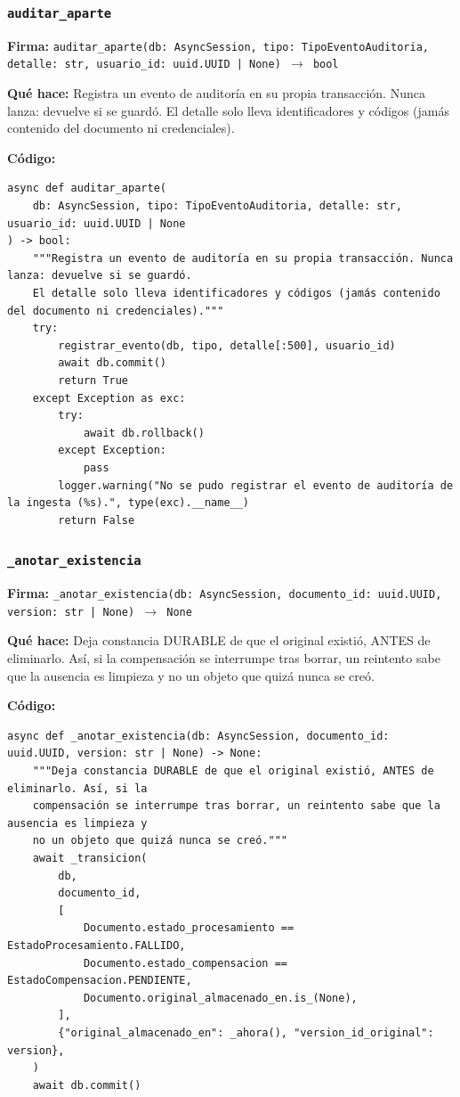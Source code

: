 \documentclass[11pt,a4paper]{article}
\begin{document}
\subsubsection*{\texttt{auditar\_aparte}}
\textbf{Firma:} \texttt{auditar\_aparte(db: AsyncSession, tipo: TipoEventoAuditoria, detalle: str, usuario\_id: uuid.UUID | None) $\rightarrow$ bool}

\textbf{Qué hace:} Registra un evento de auditoría en su propia transacción. Nunca lanza: devuelve si se guardó.
El detalle solo lleva identificadores y códigos (jamás contenido del documento ni credenciales).

\textbf{Código:}
\begin{lstlisting}
async def auditar_aparte(
    db: AsyncSession, tipo: TipoEventoAuditoria, detalle: str, usuario_id: uuid.UUID | None
) -> bool:
    """Registra un evento de auditoría en su propia transacción. Nunca lanza: devuelve si se guardó.
    El detalle solo lleva identificadores y códigos (jamás contenido del documento ni credenciales)."""
    try:
        registrar_evento(db, tipo, detalle[:500], usuario_id)
        await db.commit()
        return True
    except Exception as exc:
        try:
            await db.rollback()
        except Exception:
            pass
        logger.warning("No se pudo registrar el evento de auditoría de la ingesta (%s).", type(exc).__name__)
        return False
\end{lstlisting}

\subsubsection*{\texttt{\_anotar\_existencia}}
\textbf{Firma:} \texttt{\_anotar\_existencia(db: AsyncSession, documento\_id: uuid.UUID, version: str | None) $\rightarrow$ None}

\textbf{Qué hace:} Deja constancia DURABLE de que el original existió, ANTES de eliminarlo. Así, si la
compensación se interrumpe tras borrar, un reintento sabe que la ausencia es limpieza y
no un objeto que quizá nunca se creó.

\textbf{Código:}
\begin{lstlisting}
async def _anotar_existencia(db: AsyncSession, documento_id: uuid.UUID, version: str | None) -> None:
    """Deja constancia DURABLE de que el original existió, ANTES de eliminarlo. Así, si la
    compensación se interrumpe tras borrar, un reintento sabe que la ausencia es limpieza y
    no un objeto que quizá nunca se creó."""
    await _transicion(
        db,
        documento_id,
        [
            Documento.estado_procesamiento == EstadoProcesamiento.FALLIDO,
            Documento.estado_compensacion == EstadoCompensacion.PENDIENTE,
            Documento.original_almacenado_en.is_(None),
        ],
        {"original_almacenado_en": _ahora(), "version_id_original": version},
    )
    await db.commit()
\end{lstlisting}
\end{document}
